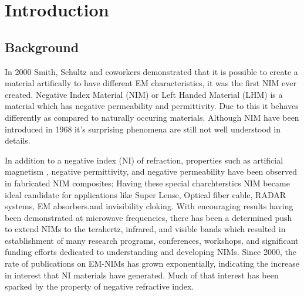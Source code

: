 
\chapter{Introduction} %

\label{Chapter1} %



\section{Background }

In 2000 Smith, Schultz and coworkers \citep{smith} demonstrated that it is possible to create a material artifically to have different EM  characteristics, it was the first NIM ever created. Negative Index Material (NIM) or Left Handed Material (LHM) is a material which has negative permeability and permittivity. Due to this it behaves differently as compared to naturally occuring materials. Although NIM have been introduced in 1968 %
it's surprising phenomena are still not well understood in details.

 In addition
to a negative index (NI) of refraction, properties such as artificial
magnetism %
, negative permittivity, and negative permeability have
been observed in fabricated NIM composites; 
Having these special charchterstics NIM became ideal candidate 
for applications like Super Lense, Optical fiber cable, RADAR systems, EM absorbers.and invisibility cloking. With
encouraging results having been demonstrated at microwave
frequencies, there has been a determined push to extend NIMs to
the terahertz, infrared, and visible bands which resulted in establishment of many
research programs, conferences, workshops, and significant
funding efforts dedicated to understanding and developing NIMs.
Since 2000, the rate of publications on EM-NIMs has grown
exponentially, %
indicating the increase in interest that NI
materials have generated. Much of that interest has been sparked by
the property of negative refractive index.

